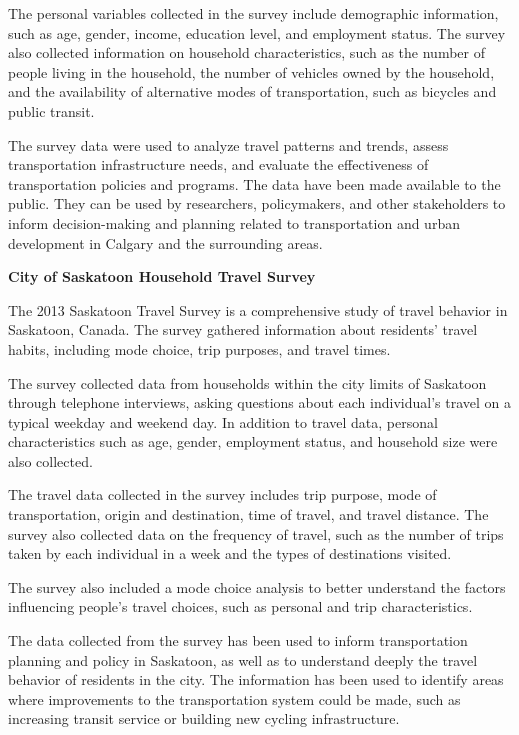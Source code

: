 \documentclass[
11pt, %
oneside, %
english, %
singlespacing, %
]{macthesis} %
\begin{document}
The personal variables collected in the survey include demographic information, such as age, gender, income, education level, and employment status. The survey also collected information on household characteristics, such as the number of people living in the household, the number of vehicles owned by the household, and the availability of alternative modes of transportation, such as bicycles and public transit.

The survey data were used to analyze travel patterns and trends, assess transportation infrastructure needs, and evaluate the effectiveness of transportation policies and programs. The data have been made available to the public. They can be used by researchers, policymakers, and other stakeholders to inform decision-making and planning related to transportation and urban development in Calgary and the surrounding areas.

\textbf{City of Saskatoon Household Travel Survey}

The 2013 Saskatoon Travel Survey is a comprehensive study of travel behavior in Saskatoon, Canada. The survey gathered information about residents' travel habits, including mode choice, trip purposes, and travel times.

The survey collected data from households within the city limits of Saskatoon through telephone interviews, asking questions about each individual's travel on a typical weekday and weekend day. In addition to travel data, personal characteristics such as age, gender, employment status, and household size were also collected.

The travel data collected in the survey includes trip purpose, mode of transportation, origin and destination, time of travel, and travel distance. The survey also collected data on the frequency of travel, such as the number of trips taken by each individual in a week and the types of destinations visited.

The survey also included a mode choice analysis to better understand the factors influencing people's travel choices, such as personal and trip characteristics.

The data collected from the survey has been used to inform transportation planning and policy in Saskatoon, as well as to understand deeply the travel behavior of residents in the city. The information has been used to identify areas where improvements to the transportation system could be made, such as increasing transit service or building new cycling infrastructure.
\end{document}
